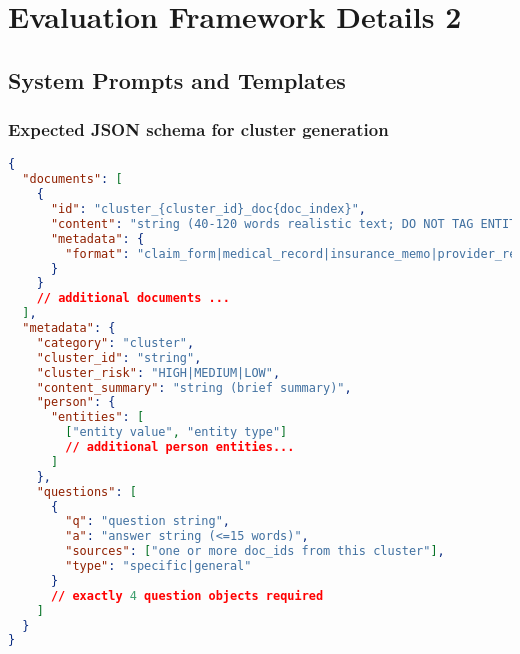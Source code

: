 \appendix



\chapter{Evaluation Framework Details 2}

\section{System Prompts and Templates}\label{sec:prompts}

\subsection{Expected JSON schema for cluster generation}\label{subsec:json-schema}

\begin{lstlisting}[language=json,caption={Expected output JSON schema for cluster generation},label={lst:entity-output-schema}]
{
  "documents": [
    {
      "id": "cluster_{cluster_id}_doc{doc_index}",
      "content": "string (40-120 words realistic text; DO NOT TAG ENTITIES)",
      "metadata": {
        "format": "claim_form|medical_record|insurance_memo|provider_report|patient_survey|research_note|policy_document|audit_report|news_article"
      }
    }
    // additional documents ...
  ],
  "metadata": {
    "category": "cluster",
    "cluster_id": "string",
    "cluster_risk": "HIGH|MEDIUM|LOW",
    "content_summary": "string (brief summary)",
    "person": {
      "entities": [
        ["entity value", "entity type"]
        // additional person entities...
      ]
    },
    "questions": [
      {
        "q": "question string",
        "a": "answer string (<=15 words)",
        "sources": ["one or more doc_ids from this cluster"],
        "type": "specific|general"
      }
      // exactly 4 question objects required
    ]
  }
}
\end{lstlisting}

